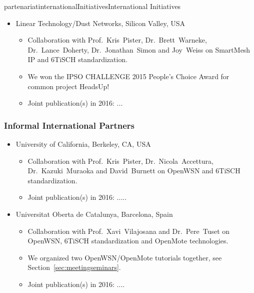 \documentclass{ra2016}
\begin{document}
\begin{module}{partenariat}{internationalInitiatives}{International Initiatives}
\begin{itemize}
    \item Linear Technology/Dust Networks, Silicon Valley, USA
        \begin{itemize}
            \item Collaboration with Prof.~Kris~Pister, Dr.~Brett~Warneke, Dr.~Lance~Doherty, Dr.~Jonathan~Simon and Joy~Weiss on SmartMesh IP and 6TiSCH standardization.
            \item We won the IPSO CHALLENGE 2015 People's Choice Award for common project HeadsUp!
            \item Joint publication(s) in 2016: ...
        \end{itemize}
    
\end{itemize}


%





	\subsubsection{Informal International Partners}
	\begin{itemize}
    
    \item University of California, Berkeley, CA, USA
        \begin{itemize}
            \item Collaboration with Prof.~Kris~Pister, Dr.~Nicola~Accettura, Dr.~Kazuki~Muraoka and David~Burnett on OpenWSN and 6TiSCH standardization.
            \item Joint publication(s) in 2016: .....
        \end{itemize}
    
    \item Universitat Oberta de Catalunya, Barcelona, Spain
        \begin{itemize}
            \item Collaboration with Prof.~Xavi~Vilajosana and Dr.~Pere~Tuset on OpenWSN, 6TiSCH standardization and OpenMote technologies.
            \item We organized two OpenWSN/OpenMote tutorials together, see Section~\ref{sec:meetingseminars}.
            \item Joint publication(s) in 2016: ....
        \end{itemize}
    

\end{itemize}
\end{module}
\end{document}
